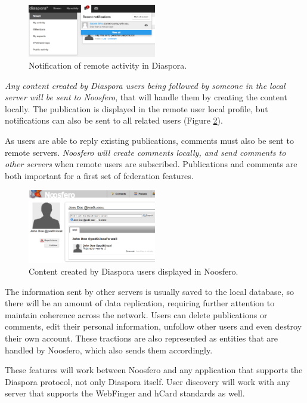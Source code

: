 \begin{figure}[hbt]
  \centering
    \includegraphics[width=0.5\textwidth]{figures/diaspora_notification.eps}
  \caption{Notification of remote activity in Diaspora.}
  \label{fig:diaspora_notification}
\end{figure}

\textit{Any content created by Diaspora users being followed by someone in the
local server will be sent to Noosfero}, that will handle them by creating
the content locally. The publication is displayed in the remote user
local profile, but notifications can also be sent to all related users
(Figure \ref{fig:noosfero_remote_wall}).

As users are able to reply existing publications, comments must also be sent
to remote servers. \textit{Noosfero will create comments locally, and send
comments to other servers} when remote users are subscribed. Publications
and comments are both important for a first set of federation features.

\begin{figure}[hbt]
  \centering
    \includegraphics[width=0.5\textwidth]{figures/noosfero_remote_wall.eps}
  \caption{Content created by Diaspora users displayed in Noosfero.}
  \label{fig:noosfero_remote_wall}
\end{figure}

The information sent by other servers is usually saved to the local database, so
there will be an amount of data replication, requiring further attention to maintain
coherence across the network. Users can delete publications or comments, edit their
personal information, unfollow other users and even destroy their own account. These
tractions are also represented as entities that are handled by Noosfero, which also
sends them accordingly.

These features will work between Noosfero and any application that
supports the Diaspora protocol, not only Diaspora itself. User discovery
will work with any server that supports the WebFinger and hCard
standards as well.
